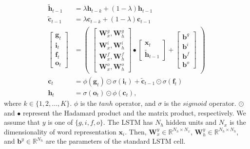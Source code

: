 \documentclass[letterpaper]{article} \usepackage{aaai19}  \usepackage{times}  \usepackage{helvet}  \usepackage{courier}  \usepackage{url}  \usepackage{graphicx}  \usepackage{amsmath}
\begin{document}
\begin{equation}
\begin{aligned}
  \mathbf{\widetilde{h}}_{t-1} &= \lambda\mathbf{h}_{t-k} + (1-\lambda)\mathbf{h}_{t-1} \\
  \mathbf{\widetilde{c}}_{t-1} &= \lambda\mathbf{c}_{t-k} + (1-\lambda)\mathbf{c}_{t-1} \\
  \begin{bmatrix}
  {\mathbf{g}}_t\\
  {\mathbf{i}}_t\\
  {\mathbf{f}}_t\\
  {\mathbf{o}}_t
  \end{bmatrix}
  &=
  \begin{pmatrix}
    \begin{bmatrix}
    \mathbf{W}_x^{g},\mathbf{W}_{h}^{g}\\
    \mathbf{W}_x^{i},\mathbf{W}_{h}^{i}\\
    \mathbf{W}_x^{f},\mathbf{W}_{h}^{f}\\
    \mathbf{W}_x^{o},\mathbf{W}_{h}^{o}
    \end{bmatrix}
    \bullet
    \begin{bmatrix}
    \mathbf{x}_t\\
    \mathbf{\widetilde{h}}_{t-1}
    \end{bmatrix}
  +
    \begin{bmatrix}
    \mathbf{b}^{g}\\
    \mathbf{b}^{i}\\
    \mathbf{b}^{f}\\
    \mathbf{b}^{o}
    \end{bmatrix}\label{eq:lstm1}
  \end{pmatrix}\\
  \mathbf{c}_t\ \ \ &= \phi(\mathbf{g}_t) \odot \sigma(\mathbf{i}_t) + \widetilde{\mathbf{c}}_{t-1}\odot \sigma(\mathbf{f}_t) \\
  \mathbf{h}_t\ \ \ &= \sigma(\mathbf{o}_t)  \odot \phi\left( \mathbf{c}_t \right),
\end{aligned}
\end{equation}
where $k\in\{1,2,...,K\}$. $\phi$ is the $tanh$ operator, and $\sigma$ is the $sigmoid$ operator. $\odot$ and $\bullet$ represent the Hadamard product and the matrix product, respectively. We assume that $y$ is one of $\{g,i,f,o\}$. The LSTM has $N_h$ hidden units and $N_x$ is the dimensionality of word representation $\mathbf{x}_i$. Then, $\mathbf{W}_x^y \in \mathbb{R}^{N_h\times{N_x}}$, $\mathbf{W}_h^y \in \mathbb{R}^{N_h\times{N_h}}$, and $\mathbf{b}^y \in \mathbb{R}^{N_h}$ are the parameters of the standard LSTM cell.
\end{document}

